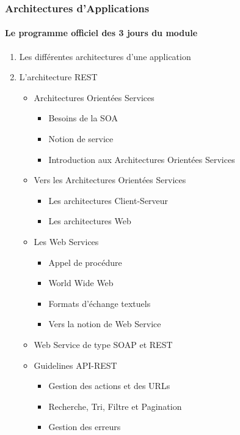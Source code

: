 \documentclass{beamer}
\begin{document}
    \begin{frame}
        \frametitle{Architectures d’Applications}
        \framesubtitle{Le programme officiel des 3 jours du module}
        \transdissolve
        \fontsize{8pt}{8pt}\selectfont
        \begin{enumerate}
            \item Les différentes architectures d’une application
            \item L’architecture REST
            \begin{itemize}
                \fontsize{8pt}{8pt}\selectfont
                \item Architectures Orientées Services
                \begin{itemize}
                    \item Besoins de la SOA
                    \item Notion de service
                    \item Introduction aux Architectures Orientées Services
                \end{itemize}
                \item Vers les Architectures Orientées Services
                \begin{itemize}
                    \item Les architectures Client-Serveur
                    \item Les architectures Web
                \end{itemize}
                \item Les Web Services
                \begin{itemize}
                    \item Appel de procédure
                    \item World Wide Web
                    \item Formats d’échange textuels
                    \item Vers la notion de Web Service
                \end{itemize}
                \item Web Service de type SOAP et REST
                \item Guidelines API-REST
                \begin{itemize}
                    \item Gestion des actions et des URLs
                    \item Recherche, Tri, Filtre et Pagination
                    \item Gestion des erreurs
                \end{itemize}
            \end{itemize}
        \end{enumerate}
    \end{frame}
\end{document}
